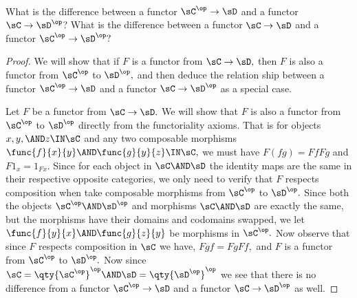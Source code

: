 \documentclass[../../main]{subfiles}
\begin{document}
\paragraph{}
\begin{exercise}
	What is the difference between a functor
	$ \sC^{\op}\to \sD $ and a functor $ \sC\to \sD^{\op} $? What is the
	difference between a functor  $ \sC \to \sD $ and a functor $ \sC^{\op}\to \sD^{\op}?$
\end{exercise}

\begin{proof}
	We will show that if $ F $ is a functor from $ \sC\to\sD,$ then $ F $ is
	also a functor from $ \sC^\op $ to $ \sD^\op,$ and then deduce the relation
	ship between a functor $ \sC^{\op}\to \sD $ and a functor $ \sC\to
	\sD^{\op}$ as a special case.

	Let $ F $ be a functor from $ \sC\to\sD.$ We will show that $ F $ 
	is also a functor from $ \sC^\op $ to $ \sD^\op$ directly from the 
	functoriality axioms.
	That is for objects $ x,y,\AND z\IN\sC $ and any two composable
	morphisms $ \func{f}{x}{y}\AND \func{g}{y}{z} \IN\sC,$  we must have
	$F(fg)=FfFg$ and $ F1_x=1_{Fx}.$ Since for each object in $ \sC\AND \sD $
	the identity maps are the same in their respective opposite categories, we
	only need to verify that $ F $ respects composition when take composable
	morphisms from $\sC^\op $ to $ \sD^\op.$ Since both the objects $ \sC^\op
	\AND\sD^\op$ and morphisms $ \sC\AND \sD$ are exactly the same, but the morphisms have their domains and codomains swapped, we let $ \func{f}{y}{x} \AND \func{g}{z}{y}$ be morphisms in $ \sC^\op. $ Now observe that since $ F $ respects composition in $ \sC $ we have,
	$ Fgf=FgFf, $ and $ F $ is a functor from $ \sC^\op  $ to $
	\sD^\op. $ Now since $ \sC=\qty{\sC^\op}^\op \AND \sD=\qty{\sD^\op}^\op$ we
	see that there is no difference from a functor $ \sC^{\op} \to \sD $ and a
	functor $ \sC\to \sD^{\op}  $ as well.
\end{proof}
\end{document}

